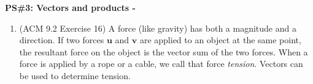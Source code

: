 \documentclass[10pt]{article}
\newcommand{\vu}{\mathbf{u}}
\newcommand{\vv}{\mathbf{v}}
\renewcommand{\section}[1]{\begin{center} \textbf{#1} \\\end{center}}
\begin{document}
%


\allowdisplaybreaks
\section{PS\#3: Vectors and products -  }

\begin{enumerate}[leftmargin=0pt]
    \item 
    \begin{minipage}[t]{0.5\linewidth}
    (ACM 9.2 Exercise 16)
    A force (like gravity) has both a magnitude and a direction. If two forces $\vu$ and $\vv$ are applied to an object at the same point, the resultant force on the object is the vector sum of the two forces. When a force is applied by a rope or a cable, we call that force \textit{tension}. Vectors can be used to determine tension.
    

\end{minipage}
\end{enumerate}
\end{document}
